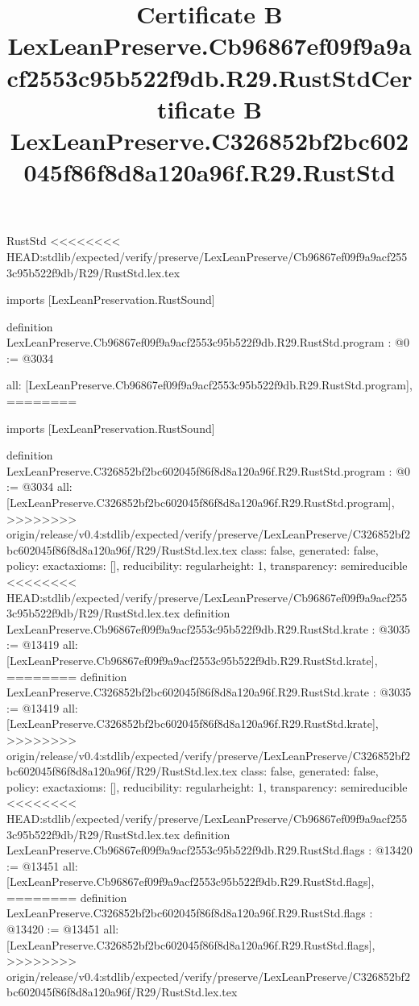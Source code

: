 \begin{lexlean}{RustStd}
<<<<<<<< HEAD:stdlib/expected/verify/preserve/LexLeanPreserve/Cb96867ef09f9a9acf2553c95b522f9db/R29/RustStd.lex.tex
\title{Certificate B LexLeanPreserve.Cb96867ef09f9a9acf2553c95b522f9db.R29.RustStd}
\begin{coremodule}
imports [LexLeanPreservation.RustSound]

definition LexLeanPreserve.Cb96867ef09f9a9acf2553c95b522f9db.R29.RustStd.program : @0 := @3034 {
  all: [LexLeanPreserve.Cb96867ef09f9a9acf2553c95b522f9db.R29.RustStd.program],
========
\title{Certificate B LexLeanPreserve.C326852bf2bc602045f86f8d8a120a96f.R29.RustStd}
\begin{coremodule}
imports [LexLeanPreservation.RustSound]

definition LexLeanPreserve.C326852bf2bc602045f86f8d8a120a96f.R29.RustStd.program : @0 := @3034 {
  all: [LexLeanPreserve.C326852bf2bc602045f86f8d8a120a96f.R29.RustStd.program],
>>>>>>>> origin/release/v0.4:stdlib/expected/verify/preserve/LexLeanPreserve/C326852bf2bc602045f86f8d8a120a96f/R29/RustStd.lex.tex
  class: false,
  generated: false,
  policy: exact{axioms: []},
  reducibility: regular{height: 1},
  transparency: semireducible
}
<<<<<<<< HEAD:stdlib/expected/verify/preserve/LexLeanPreserve/Cb96867ef09f9a9acf2553c95b522f9db/R29/RustStd.lex.tex
definition LexLeanPreserve.Cb96867ef09f9a9acf2553c95b522f9db.R29.RustStd.krate : @3035 := @13419 {
  all: [LexLeanPreserve.Cb96867ef09f9a9acf2553c95b522f9db.R29.RustStd.krate],
========
definition LexLeanPreserve.C326852bf2bc602045f86f8d8a120a96f.R29.RustStd.krate : @3035 := @13419 {
  all: [LexLeanPreserve.C326852bf2bc602045f86f8d8a120a96f.R29.RustStd.krate],
>>>>>>>> origin/release/v0.4:stdlib/expected/verify/preserve/LexLeanPreserve/C326852bf2bc602045f86f8d8a120a96f/R29/RustStd.lex.tex
  class: false,
  generated: false,
  policy: exact{axioms: []},
  reducibility: regular{height: 1},
  transparency: semireducible
}
<<<<<<<< HEAD:stdlib/expected/verify/preserve/LexLeanPreserve/Cb96867ef09f9a9acf2553c95b522f9db/R29/RustStd.lex.tex
definition LexLeanPreserve.Cb96867ef09f9a9acf2553c95b522f9db.R29.RustStd.flags : @13420 := @13451 {
  all: [LexLeanPreserve.Cb96867ef09f9a9acf2553c95b522f9db.R29.RustStd.flags],
========
definition LexLeanPreserve.C326852bf2bc602045f86f8d8a120a96f.R29.RustStd.flags : @13420 := @13451 {
  all: [LexLeanPreserve.C326852bf2bc602045f86f8d8a120a96f.R29.RustStd.flags],
>>>>>>>> origin/release/v0.4:stdlib/expected/verify/preserve/LexLeanPreserve/C326852bf2bc602045f86f8d8a120a96f/R29/RustStd.lex.tex
}}}
\end{coremodule}}
\end{coremodule}
\end{lexlean}
